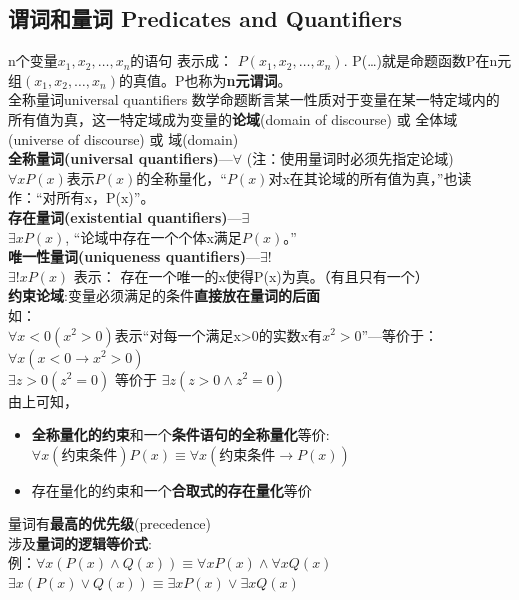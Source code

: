 \documentclass{article}
\begin{document}
    \subsection{谓词和量词 Predicates and Quantifiers}
    n个变量$x_1,x_2,\dots,x_n$的语句 表示成： $P(x_1,x_2,\dots,x_n)$.
    P(\dots)就是命题函数P在n元组$(x_1,x_2,\dots,x_n)$的真值。P也称为\textbf{n元谓词}。\\
    全称量词universal quantifiers
    数学命题断言某一性质对于变量在某一特定域内的所有值为真，这一特定域成为变量的\textbf{论域}(domain of discourse) 或 全体域(universe of discourse) 或 域(domain)
    \\
    \textbf{全称量词(universal quantifiers)}---$\forall$ (注：使用量词时必须先指定论域)\\
    $\forall x P(x)$表示$P(x)$的全称量化，“$P(x)$对x在其论域的所有值为真，”也读作：“对所有x，P(x)”。
    \\
    \textbf{存在量词(existential quantifiers)}---$\exists$ \\
    $\exists x P(x)$, “论域中存在一个个体x满足$P(x)$。” \\
    \textbf{唯一性量词(uniqueness quantifiers)}---$\exists!$ \\
    $\exists ! x P(x)$ 表示： 存在一个唯一的x使得P(x)为真。（有且只有一个） \\
    \textbf{约束论域}:变量必须满足的条件\textbf{直接放在量词的后面}\\
    如：\\
    $\forall x<0(x^{2}>0)$表示“对每一个满足x>0的实数x有$x^{2}>0$”---等价于：$\forall x(x<0\rightarrow x^{2}>0)$
    \\
    $\exists z>0(z^{2}=0)$ 等价于 $\exists z(z>0 \wedge z^{2}=0)$ \\
    由上可知，
    \begin{itemize}
        \item \textbf{全称量化的约束}和一个\textbf{条件语句的全称量化}等价:\\
        $\forall x(\text{约束条件})P(x) \equiv \forall x(\text{约束条件}\rightarrow P(x))$
        \item 存在量化的约束和一个\textbf{合取式的存在量化}等价
    \end{itemize}
    量词有\textbf{最高的优先级}(precedence) \\
    涉及\textbf{量词的逻辑等价式}:\\
    例：$\forall x(P(x)\wedge Q(x)) \equiv \forall xP(x) \wedge \forall xQ(x)$ 
    \\
    $\exists x(P(x)\vee Q(x)) \equiv \exists xP(x) \vee \exists xQ(x)$
\end{document}
